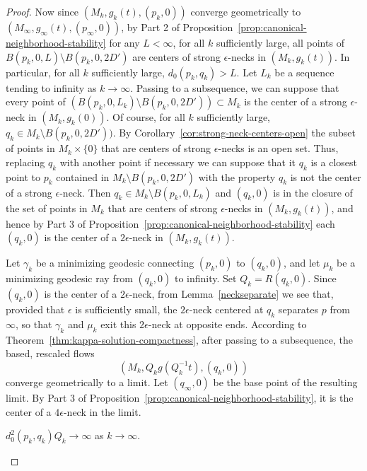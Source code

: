 \begin{proof}
Now since $(M_k,g_k(t),(p_k,0))$ converge geometrically to
$(M_\infty,g_\infty(t),(p_\infty,0))$, by Part 2 of
Proposition~\ref{prop:canonical-neighborhood-stability} for any $L<\infty$, for all $k$
sufficiently large, all points of $B(p_k,0,L)\setminus B(p_k,0,2D')$
are centers of strong $\epsilon$-necks in $(M_k,g_k(t))$. In
particular, for all $k$ sufficiently large, $d_0(p_k,q_k)>L$. Let
$L_k$ be a sequence tending to infinity as $k\rightarrow \infty$.
Passing to a subsequence, we can suppose that every point of
$\left(B(p_k,0,L_k)\setminus B(p_k,0,2D')\right)\subset M_k$ is the
center of a strong $\epsilon$-neck in $(M_k,g_k(0))$.  Of course,
for all $k$ sufficiently large, $q_k\in M_k\setminus B(p_k,0,2D'))$.
By Corollary~\ref{cor:strong-neck-centers-open} the subset of points in $M_k\times
\{0\}$ that are centers of strong $\epsilon$-necks is an open set.
Thus, replacing $q_k$ with another point if necessary we can suppose
that it $q_k$ is a closest point to $p_k$ contained in $M_k\setminus
B(p_k,0,2D')$ with the property $q_k$ is not the center of a strong
$\epsilon$-neck. Then $q_k\in M_k\setminus B(p_k,0,L_k)$ and
$(q_k,0)$ is in the closure of the set of points in $M_k$ that are
centers of strong $\epsilon$-necks in $(M_k,g_k(t))$, and hence by
Part 3 of Proposition~\ref{prop:canonical-neighborhood-stability} each $(q_k,0)$ is the center
of a $2\epsilon$-neck in $(M_k,g_k(t))$.

Let $\gamma_k$ be a minimizing geodesic connecting $(p_k,0)$ to
$(q_k,0)$, and let $\mu_k$ be a minimizing geodesic ray from
$(q_k,0)$ to infinity. Set $Q_k=R(q_k,0)$. Since $(q_k,0)$ is the
center of a $2\epsilon$-neck, from Lemma~\ref{neckseparate} we see
that, provided that $\epsilon$ is sufficiently small,  the
$2\epsilon$-neck centered at $q_k$ separates $p$ from $\infty$, so
that $\gamma_k$ and $\mu_k$ exit this $2\epsilon$-neck at opposite
ends. According to Theorem~\ref{thm:kappa-solution-compactness}, after passing to a
subsequence, the based, rescaled flows
$$(M_k,Q_kg(Q_k^{-1}t),(q_k,0))$$
converge geometrically to a limit. Let $(q_\infty,0)$ be the base
point of the resulting limit. By Part 3 of
Proposition~\ref{prop:canonical-neighborhood-stability}, it is the center of a $4\epsilon$-neck
in the limit.

\begin{claim}\label{claim:kq-scale-separation}
$d_0^2(p_k,q_k)Q_k\rightarrow \infty$ as $k\rightarrow \infty$.
\end{claim}


\end{proof}
